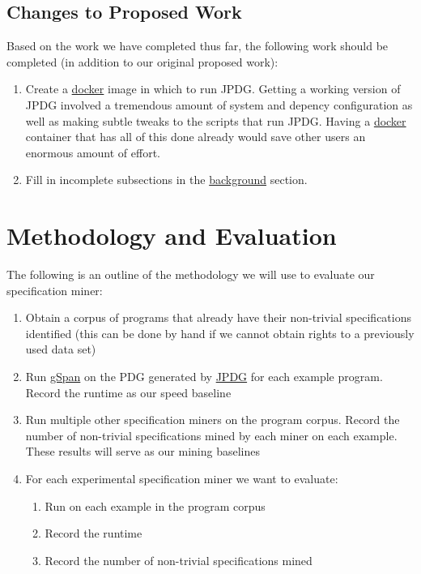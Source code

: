 \documentclass[12pt]{article}
\begin{document}
\subsection{Changes to Proposed Work}
Based on the work we have completed thus far, the following work should be completed (in addition to our original proposed work):

\begin{enumerate}
    \item Create a \hyperref[subsection:Docker]{docker} image in which to run JPDG. Getting a working version of JPDG involved a tremendous amount of system and depency configuration as well as making subtle tweaks to the scripts that run JPDG. Having a \hyperref[subsection:Docker]{docker} container that has all of this done already would save other users an enormous amount of effort.
    \item Fill in incomplete subsections in the \hyperref[section:Background]{background} section.
\end{enumerate}

\section{Methodology and Evaluation}
The following is an outline of the methodology we will use to evaluate our specification miner:

\begin{enumerate}
    \item Obtain a corpus of programs that already have their non-trivial specifications identified (this can be done by hand if we cannot obtain rights to a previously used data set)
    \item Run \hyperref[subsection:gSpan]{gSpan} on the PDG generated by \hyperref[subsection:JPDG]{JPDG} for each example program. Record the runtime as our speed baseline
    \item Run multiple other specification miners on the program corpus. Record the number of non-trivial specifications mined by each miner on each example. These results will serve as our mining baselines
    \item For each experimental specification miner we want to evaluate:
    \begin{enumerate}
        \item Run on each example in the program corpus
        \item Record the runtime
        \item Record the number of non-trivial specifications mined
    \end{enumerate}
\end{enumerate}
\end{document}
